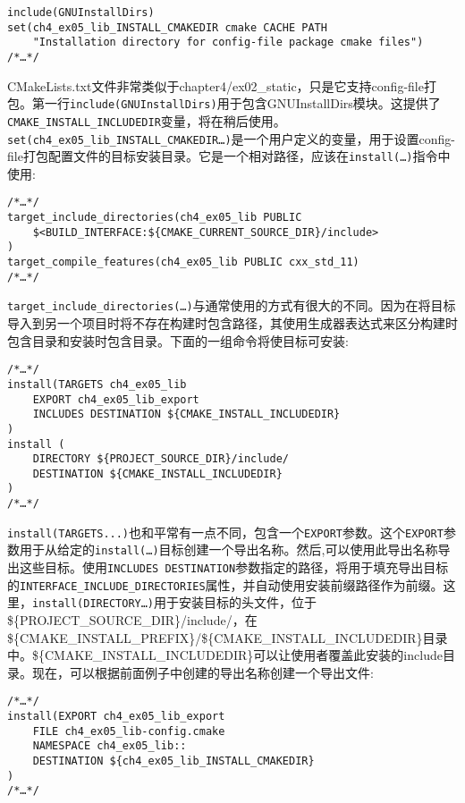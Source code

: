 \begin{lstlisting}[style=styleCMake]
include(GNUInstallDirs)
set(ch4_ex05_lib_INSTALL_CMAKEDIR cmake CACHE PATH
	"Installation directory for config-file package cmake files")
/*…*/
\end{lstlisting}

CMakeLists.txt文件非常类似于chapter4/ex02\_static，只是它支持config-file打包。第一行\texttt{include(GNUInstallDirs)}用于包含GNUInstallDirs模块。这提供了\texttt{CMAKE\_INSTALL\_INCLUDEDIR}变量，将在稍后使用。\texttt{set(ch4\_ex05\_lib\_INSTALL\_CMAKEDIR…)}是一个用户定义的变量，用于设置config-file打包配置文件的目标安装目录。它是一个相对路径，应该在\texttt{install(…)}指令中使用:

\begin{lstlisting}[style=styleCMake]
/*…*/
target_include_directories(ch4_ex05_lib PUBLIC
	$<BUILD_INTERFACE:${CMAKE_CURRENT_SOURCE_DIR}/include>
)
target_compile_features(ch4_ex05_lib PUBLIC cxx_std_11)
/*…*/
\end{lstlisting}

\texttt{target\_include\_directories(…)}与通常使用的方式有很大的不同。因为在将目标导入到另一个项目时将不存在构建时包含路径，其使用生成器表达式来区分构建时包含目录和安装时包含目录。下面的一组命令将使目标可安装:

\begin{lstlisting}[style=styleCMake]
/*…*/
install(TARGETS ch4_ex05_lib
	EXPORT ch4_ex05_lib_export
	INCLUDES DESTINATION ${CMAKE_INSTALL_INCLUDEDIR}
)
install (
	DIRECTORY ${PROJECT_SOURCE_DIR}/include/
	DESTINATION ${CMAKE_INSTALL_INCLUDEDIR}
)
/*…*/
\end{lstlisting}

\texttt{install(TARGETS...)}也和平常有一点不同，包含一个\texttt{EXPORT}参数。这个\texttt{EXPORT}参数用于从给定的\texttt{install(…)}目标创建一个导出名称。然后,可以使用此导出名称导出这些目标。使用\texttt{INCLUDES DESTINATION}参数指定的路径，将用于填充导出目标的\texttt{INTERFACE\_INCLUDE\_DIRECTORIES}属性，并自动使用安装前缀路径作为前缀。这里，\texttt{install(DIRECTORY…)}用于安装目标的头文件，位于\$\{PROJECT\_SOURCE\_DIR\}/include/，在\$\{CMAKE\_INSTALL\_PREFIX\}/\$\{CMAKE\_INSTALL\_INCLUDEDIR\}目录中。\$\{CMAKE\_INSTALL\_INCLUDEDIR\}可以让使用者覆盖此安装的include目录。现在，可以根据前面例子中创建的导出名称创建一个导出文件:

\begin{lstlisting}[style=styleCMake]
/*…*/
install(EXPORT ch4_ex05_lib_export
	FILE ch4_ex05_lib-config.cmake
	NAMESPACE ch4_ex05_lib::
	DESTINATION ${ch4_ex05_lib_INSTALL_CMAKEDIR}
)
/*…*/
\end{lstlisting}

